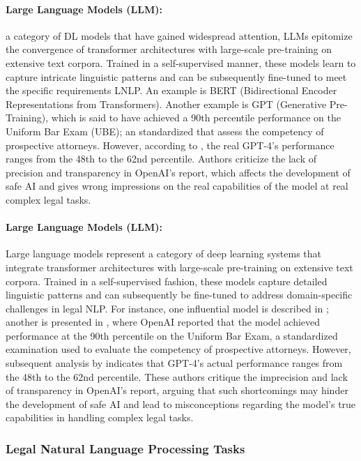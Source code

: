 \documentclass[onecolumn, journal, english, 12pt, a4paper]{IEEEtran} %
\theoremstyle{definition}
\begin{document}
\paragraph{Large Language Models (LLM):} a category of DL models that
have gained widespread attention, LLMs epitomize the convergence of
transformer architectures with large-scale pre-training on extensive
text corpora. Trained in a self-supervised manner, these models learn
to capture intricate linguistic patterns and can be subsequently
fine-tuned to meet the specific requirements LNLP. An example is BERT
(Bidirectional Encoder Representations from
Transformers)\cite{devlin2018bert}. Another example is GPT (Generative
Pre-Training)\cite{radford2018gpt}, which is said to have achieved a
90th percentile performance on the Uniform Bar Exam (UBE); an
standardized that assess the competency of prospective
attorneys. However, according to \cite{Martinez2024}, the real GPT-4's
performance ranges from the 48th to the 62nd percentile. Authors
criticize the lack of precision and transparency in OpenAI's report,
which affects the development of safe AI and gives wrong impressions
on the real capabilities of the model at real complex legal tasks.


\paragraph{Large Language Models (LLM):} Large language models represent a
category of deep learning systems that integrate transformer
architectures with large-scale pre-training on extensive text
corpora. Trained in a self-supervised fashion, these models capture
detailed linguistic patterns and can subsequently be fine-tuned to
address domain-specific challenges in legal NLP. For instance, one
influential model is described in \cite{devlin2018bert}; another is
presented in \cite{radford2018gpt}, where OpenAI reported that the
model achieved performance at the 90th percentile on the Uniform Bar
Exam, a standardized examination used to evaluate the competency of
prospective attorneys. However, subsequent analysis by
\cite{Martinez2024} indicates that GPT-4's actual performance ranges
from the 48th to the 62nd percentile. These authors critique the
imprecision and lack of transparency in OpenAI's report, arguing that
such shortcomings may hinder the development of safe AI and lead to
misconceptions regarding the model's true capabilities in handling
complex legal tasks.


\subsubsection{Legal Natural Language Processing Tasks}
\label{sec:legal-natur-lang-tasks}
\end{document}
